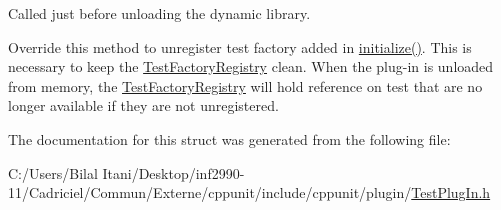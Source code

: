 Called just before unloading the dynamic library. 

Override this method to unregister test factory added in \hyperlink{struct_cpp_unit_test_plug_in_aec670330e7fced26c2a66b1dcd56edc0}{initialize()}. This is necessary to keep the \hyperlink{class_test_factory_registry}{Test\+Factory\+Registry} \textquotesingle{}clean\textquotesingle{}. When the plug-\/in is unloaded from memory, the \hyperlink{class_test_factory_registry}{Test\+Factory\+Registry} will hold reference on test that are no longer available if they are not unregistered. 

The documentation for this struct was generated from the following file\+:\begin{DoxyCompactItemize}
\item 
C\+:/\+Users/\+Bilal Itani/\+Desktop/inf2990-\/11/\+Cadriciel/\+Commun/\+Externe/cppunit/include/cppunit/plugin/\hyperlink{_test_plug_in_8h}{Test\+Plug\+In.\+h}\end{DoxyCompactItemize}
